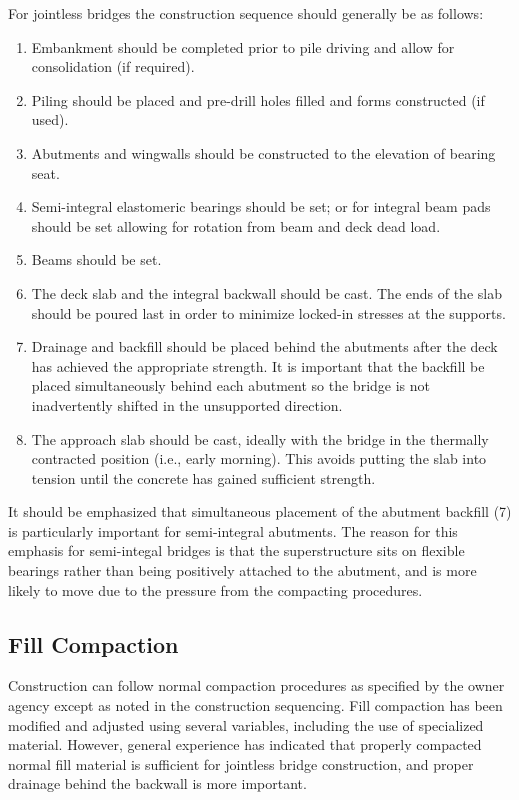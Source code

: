 For jointless bridges the construction sequence should generally be as follows:
\begin{enumerate}
  \item Embankment should be completed prior to pile driving and allow for consolidation (if required).
  \item Piling should be placed and pre-drill holes filled and forms constructed (if used).
  \item Abutments and wingwalls should be constructed to the elevation of bearing seat.
  \item Semi-integral elastomeric bearings should be set; or for integral beam pads should be set allowing for
rotation from beam and deck dead load.
  \item Beams should be set.
  \item The deck slab and the integral backwall should be cast. The ends of the slab should be poured last in
order to minimize locked-in stresses at the supports.
  \item Drainage and backfill should be placed behind the abutments after the deck has achieved the appropriate
strength. It is important that the backfill be placed simultaneously behind each abutment so the bridge is
not inadvertently shifted in the unsupported direction.
  \item The approach slab should be cast, ideally with the bridge in the thermally contracted position (i.e., early
morning). This avoids putting the slab into tension until the concrete has gained sufficient strength.
\end{enumerate}

It should be emphasized that simultaneous placement of the abutment backfill (7) is particularly important for
semi-integral abutments. The reason for this emphasis for semi-integal bridges is that the superstructure sits on
flexible bearings rather than being positively attached to the abutment, and is more likely to move due to the pressure
from the compacting procedures.

\subsection{Fill Compaction}
Construction can follow normal compaction procedures as specified by the owner agency except as noted in the
construction sequencing. Fill compaction has been modified and adjusted using several variables, including the use of
specialized material. However, general experience has indicated that properly compacted normal fill material is
sufficient for jointless bridge construction, and proper drainage behind the backwall is more important.



